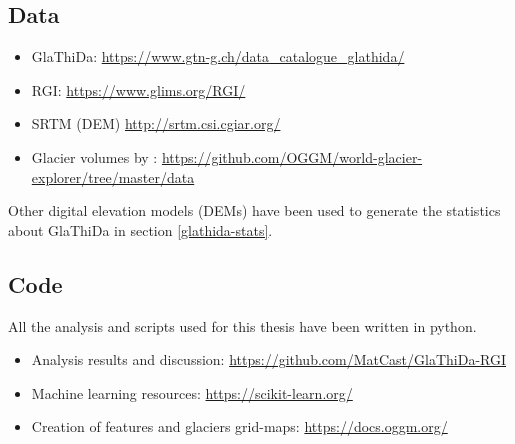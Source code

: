 \subsection{Data}
\begin{itemize}
	\item GlaThiDa: \href{https://www.gtn-g.ch/data_catalogue_glathida/}{https://www.gtn-g.ch/data\_catalogue\_glathida/}
	\item RGI: \href{https://www.glims.org/RGI/}{https://www.glims.org/RGI/}
	\item SRTM (DEM) \href{http://srtm.csi.cgiar.org/}{http://srtm.csi.cgiar.org/}
	\item Glacier volumes by \citet{Farinotti2019}: \href{https://github.com/OGGM/world-glacier-explorer/tree/master/data}{https://github.com/OGGM/world-glacier-explorer/tree/master/data}
\end{itemize}

Other digital elevation models (DEMs) have been used to generate the statistics about GlaThiDa in section \ref{glathida-stats}.

\subsection{Code}
All the analysis and scripts used for this thesis have been written in python.
\begin{itemize}
	\item Analysis results and discussion: \href{https://github.com/MatCast/GlaThiDa-RGI}{https://github.com/MatCast/GlaThiDa-RGI}
	\item Machine learning resources: \href{https://scikit-learn.org/}{https://scikit-learn.org/}
	\item Creation of features and glaciers grid-maps: \href{https://docs.oggm.org/}{https://docs.oggm.org/}
\end{itemize}


 


